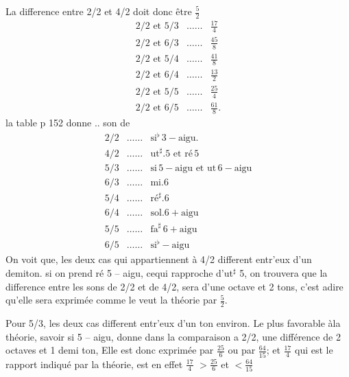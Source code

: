 \documentclass[11pt,a4paper]{article}
\begin{document}
La difference entre 2/2 et 4/2 doit donc être $\frac{5}{2}$
\[ \begin{array}{lcr}
2/2 \text{ et } 5/3 & \dots\dots & \frac{17}{4} \\
2/2 \text{ et } 6/3 & \dots\dots & \frac{45}{8} \\
2/2 \text{ et } 5/4 & \dots\dots & \frac{41}{8} \\
2/2 \text{ et } 6/4 & \dots\dots & \frac{13}{2} \\
2/2 \text{ et } 5/5 & \dots\dots & \frac{25}{4} \\
2/2 \text{ et } 6/5 & \dots\dots & \frac{61}{8}.
\end{array} \]
la table p 152 donne .. son de
\[ \begin{array}{lcl}
2/2 & \dots\dots & \text{si}^{\flat}\,3 - \text{aigu}. \\
4/2 & \dots\dots & \text{ut}^{\sharp}.5 \text{ et ré}\,5 \\
5/3 & \dots\dots & \text{si}\,5 - \text{aigu et ut}\,6 - \text{aigu} \\
6/3 & \dots\dots & \text{mi}.6 \\
5/4 & \dots\dots & \text{ré}^{\sharp}.6 \\
6/4 & \dots\dots & \text{sol}.6 + \text{aigu} \\
5/5 & \dots\dots & \text{fa}^{\sharp}\,6 + \text{aigu} \\
6/5 & \dots\dots & \text{si}^{\flat} - \text{aigu}
\end{array} \]
On voit que, les deux cas qui appartiennent à 4/2 different entr'eux
d'un demiton. si on prend ré 5 -- aigu, cequi rapproche d'ut$^{\sharp}$ 5, on
trouvera que la difference entre les sons de 2/2 et de 4/2, 
sera d'une octave et 2 tons, c'est adire qu'elle sera exprimée
comme le veut la théorie par $\frac{5}{2}$.

Pour 5/3, les deux cas different entr'eux d'un ton environ. Le plus
favorable àla théorie, savoir si 5 -- aigu, donne  dans la comparaison
a 2/2, une différence de 2 octaves et 1 demi ton, Elle est donc
exprimée par $\frac{25}{6}$ ou par $\frac{64}{15}$; et $\frac{17}{4}$ qui est le rapport indiqué
par la théorie, est en effet $\frac{17}{4}$  $> \frac{25}{6}$ et $< \frac{64}{15}$
\end{document}
